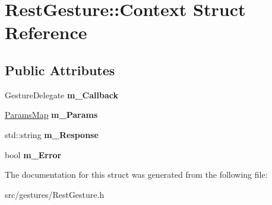 \hypertarget{struct_rest_gesture_1_1_context}{}\section{Rest\+Gesture\+:\+:Context Struct Reference}
\label{struct_rest_gesture_1_1_context}
\subsection*{Public Attributes}
\begin{DoxyCompactItemize}
\item 
\mbox{\label{struct_rest_gesture_1_1_context_a73649aba0987583e1677af3fe4e29ff5}} 
Gesture\+Delegate {\bfseries m\+\_\+\+Callback}
\item 
\mbox{\label{struct_rest_gesture_1_1_context_a9d130fbb271b2f310dedc789201a90a7}} 
\hyperlink{class_params_map}{Params\+Map} {\bfseries m\+\_\+\+Params}
\item 
\mbox{\label{struct_rest_gesture_1_1_context_a04b21096ee5c2e3d3f28c170069f213f}} 
std\+::string {\bfseries m\+\_\+\+Response}
\item 
\mbox{\label{struct_rest_gesture_1_1_context_a051a33b2e79cf21a8b097046a4ccb84a}} 
bool {\bfseries m\+\_\+\+Error}
\end{DoxyCompactItemize}


The documentation for this struct was generated from the following file\+:\begin{DoxyCompactItemize}
\item 
src/gestures/Rest\+Gesture.\+h\end{DoxyCompactItemize}
